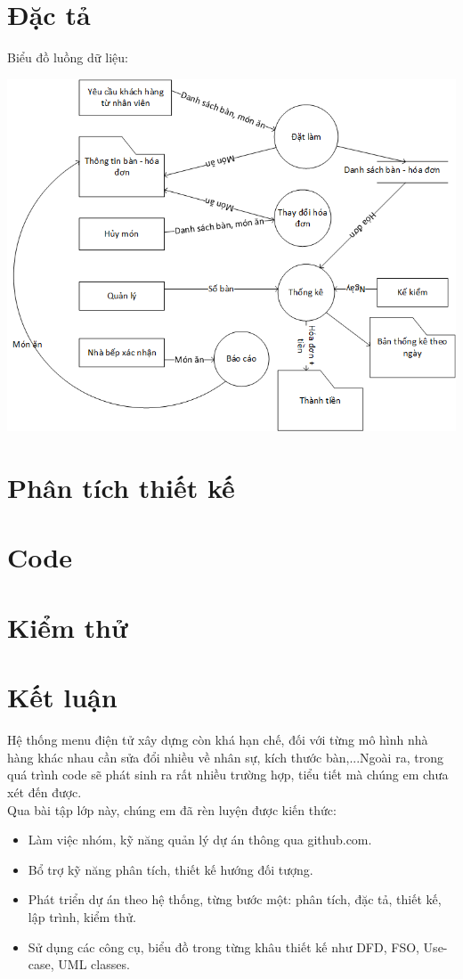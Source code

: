 \documentclass[a4paper,12pt]{report}
\begin{document}
\chapter{Đặc tả}
Biểu đồ luồng dữ liệu:\\
\begin{center}
\includegraphics[scale=0.7]{DFD.png}\\
\end{center}
\chapter{Phân tích thiết kế}
\chapter{Code}
\chapter{Kiểm thử}
\chapter{Kết luận}
Hệ thống menu điện tử xây dựng còn khá hạn chế, đối với từng mô hình nhà hàng khác nhau cần sửa đổi nhiều về nhân sự, kích thước bàn,...Ngoài ra, trong quá trình code sẽ phát sinh ra rất nhiều trường hợp, tiểu tiết mà chúng em chưa xét đến được.\\

Qua bài tập lớp này, chúng em đã rèn luyện được kiến thức:
\begin{itemize}
	\item Làm việc nhóm, kỹ năng quản lý dự án thông qua github.com.
	\item Bổ trợ kỹ năng phân tích, thiết kế hướng đối tượng.
	\item Phát triển dự án theo hệ thống, từng bước một: phân tích, đặc tả, thiết kế, lập trình, kiểm thử. 
	\item Sử dụng các công cụ, biểu đồ trong từng khâu thiết kế như DFD, FSO, Use-case, UML classes.
\end{itemize}
\end{document}
